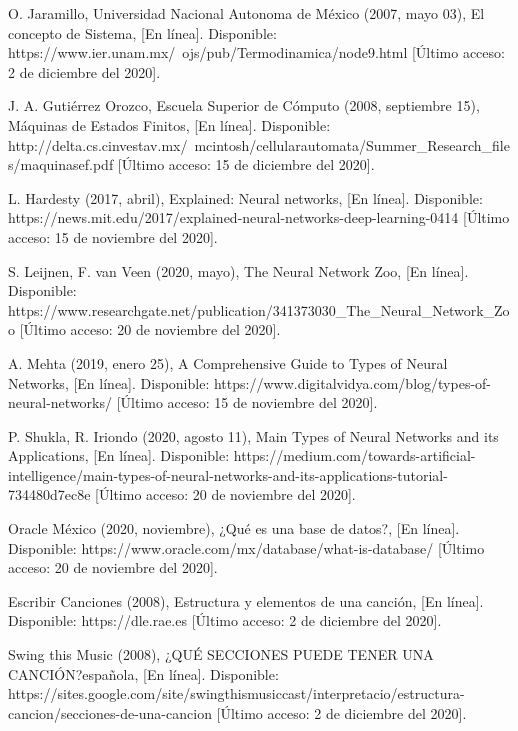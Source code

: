\documentclass[12pt, a4paper, titlepage]{report}
\begin{document}
\begin{thebibliography}{20}
		O. Jaramillo, Universidad Nacional Autonoma de México (2007, mayo 03), El concepto de Sistema, [En línea]. Disponible: https://www.ier.unam.mx/~ojs/pub/Termodinamica/node9.html [Último acceso: 2 de diciembre del 2020].

		J. A. Gutiérrez Orozco, Escuela Superior de Cómputo (2008, septiembre 15), Máquinas de Estados Finitos, [En línea]. Disponible: http://delta.cs.cinvestav.mx/~mcintosh/cellularautomata/Summer\_Research\_files/maquinasef.pdf [Último acceso: 15 de diciembre del 2020].

		L. Hardesty  (2017, abril), Explained: Neural networks, [En línea]. Disponible: https://news.mit.edu/2017/explained-neural-networks-deep-learning-0414 [Último acceso: 15 de noviembre del 2020].

		S. Leijnen, F. van Veen (2020, mayo), The Neural Network Zoo, [En línea]. Disponible: https://www.researchgate.net/publication/341373030\_The\_Neural\_Network\_Zoo [Último acceso: 20 de noviembre del 2020].

		A. Mehta (2019, enero 25), A Comprehensive Guide to Types of Neural Networks, [En línea]. Disponible: https://www.digitalvidya.com/blog/types-of-neural-networks/ [Último acceso: 15 de noviembre del 2020].

		P. Shukla, R. Iriondo (2020, agosto 11), Main Types of Neural Networks and its Applications, [En línea]. Disponible: https://medium.com/towards-artificial-intelligence/main-types-of-neural-networks-and-its-applications-tutorial-734480d7ec8e [Último acceso: 20 de noviembre del 2020].

		Oracle México (2020, noviembre), ¿Qué es una base de datos?, [En línea]. Disponible: https://www.oracle.com/mx/database/what-is-database/ [Último acceso: 20 de noviembre del 2020].

		Escribir Canciones (2008), Estructura y elementos de una canción, [En línea]. Disponible: https://dle.rae.es [Último acceso: 2 de diciembre del 2020].

		Swing this Music (2008), ¿QUÉ SECCIONES PUEDE TENER UNA CANCIÓN?española, [En línea]. Disponible: https://sites.google.com/site/swingthismusiccast/interpretacio/estructura-cancion/secciones-de-una-cancion [Último acceso: 2 de diciembre del 2020].


\end{thebibliography}
\end{document}
